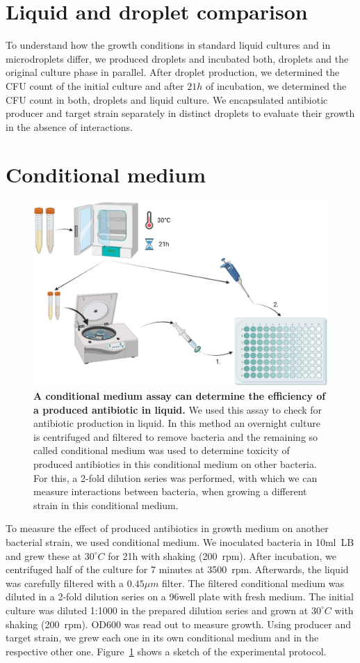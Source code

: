 \section{Liquid and droplet comparison}
To understand how the growth conditions in standard liquid cultures and in microdroplets differ, we produced droplets and incubated both, droplets and the original culture phase in parallel. After droplet production, we determined the \gls{CFU} count of the initial culture and after $21h$ of incubation, we determined the \gls{CFU} count in both, droplets and liquid culture. We encapsulated antibiotic producer and target strain separately in distinct droplets to evaluate their growth in the absence of interactions.
\section{Conditional medium}
\begin{figure}
\centering
\includegraphics[width=\linewidth]{graphics/2025_09_30_droplets_fig4.png}
\caption{\textbf{A conditional medium assay can determine the efficiency of a produced antibiotic in liquid.} We used this assay to check for antibiotic production in liquid. In this method an overnight culture is centrifuged and filtered to remove bacteria and the remaining so called conditional medium was used to determine toxicity of produced antibiotics in this conditional medium on other bacteria. For this, a 2-fold dilution series was performed, with which we can measure interactions between bacteria, when growing a different strain in this conditional medium.}
\label{fig:method_conditional_medium}
\end{figure}
To measure the effect of produced antibiotics in growth medium on another bacterial strain, we used conditional medium. We inoculated bacteria in 10ml~\gls{LB} and grew these at $30^\circ C$ for 21h with shaking (200~\gls{rpm}). After incubation, we centrifuged half of the culture for 7 minutes at 3500~\gls{rpm}. Afterwards, the liquid was carefully filtered with a $0.45 \mu m$ filter. The filtered conditional medium was diluted in a 2-fold dilution series on a 96well plate with fresh medium. The initial culture was diluted 1:1000 in the prepared dilution series and grown at $30^\circ C$  with shaking (200~\gls{rpm}). OD600 was read out to measure growth. Using producer and target strain, we grew each one in its own conditional medium and in the respective other one. Figure~\ref{fig:method_conditional_medium} shows a sketch of the experimental protocol.